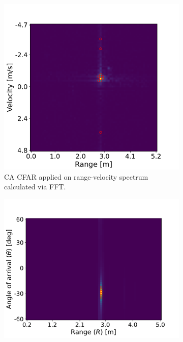 \begin{figure}[H]
    \centering
    \begin{subfigure}{0.49\textwidth}
        \centering
        \includegraphics[width=\textwidth]{fig/4/ca-cfar-fft.pdf}
        \caption{CA CFAR applied on range-velocity spectrum calculated via FFT.}
        \label{fig:ca-cfar-fft}
    \end{subfigure}
    \hfill
    \begin{subfigure}{0.49\textwidth}
        \centering
        \includegraphics[width=\textwidth]{fig/4/ca-cfar-music.pdf}

\end{subfigure}
\end{figure}
